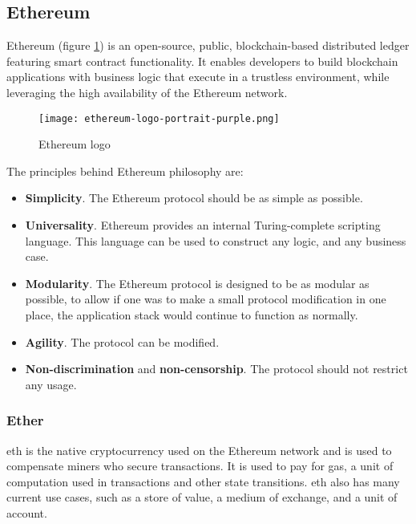 \subsection{Ethereum}
Ethereum\cite{ethereum} (figure \ref{fig:ethereum_logo}) is an open-source, public, blockchain-based distributed ledger featuring smart contract functionality. It enables developers to build blockchain applications with business logic that execute in a trustless environment, while leveraging the high availability of the Ethereum network.
\begin{figure}[h]
    \centering
    \texttt{[image: ethereum-logo-portrait-purple.png]}
    \caption{Ethereum logo}
    \label{fig:ethereum_logo}
\end{figure}
The principles behind Ethereum philosophy are\cite{ethereumWhitepaper}:
\begin{itemize}
    \item \textbf{Simplicity}. The Ethereum protocol should be as simple as possible.
    \item \textbf{Universality}. Ethereum provides an internal Turing-complete scripting language. This language can be used to construct any logic, and any business case.
    \item \textbf{Modularity}. The Ethereum protocol is designed to be as modular as possible, to allow if one was to make a small protocol modification in one place, the application stack would continue to function as normally.
    \item \textbf{Agility}. The protocol can be modified.
    \item \textbf{Non-discrimination} and \textbf{non-censorship}. The protocol should not restrict any usage.
\end{itemize}

\subsubsection{Ether}
\acrfull{eth} is the native cryptocurrency used on the Ethereum network and is used to compensate miners who secure transactions. It is used to pay for gas, a unit of computation used in transactions and other state transitions.
\acrlong{eth} also has many current use cases, such as a store of value, a medium of exchange, and a unit of account.

